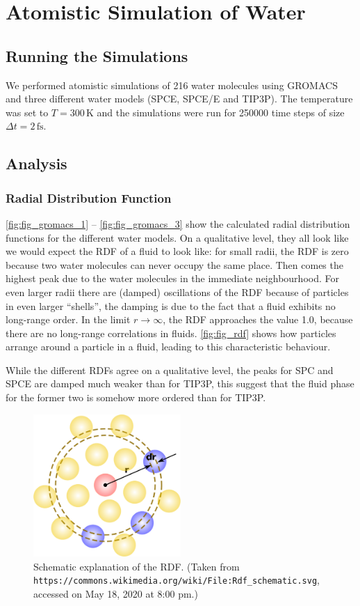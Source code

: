\documentclass[a4paper,10pt,bibtotoc]{scrartcl}
\begin{document}
\newpage
\section{Atomistic Simulation of Water}
\subsection{Running the Simulations}
We performed atomistic simulations of 216 water molecules using GROMACS and three different water models (SPCE, SPCE/E and TIP3P). The temperature was set to $T=300\,\mathrm{K}$ and the simulations were run for 250000 time steps of size $\Delta t = 2\,\mathrm{fs}$.

\subsection{Analysis}
\subsubsection*{Radial Distribution Function}
\autoref{fig:fig_gromacs_1} -- \autoref{fig:fig_gromacs_3} show the calculated radial distribution functions for the different water models.
On a qualitative level, they all look like we would expect the RDF of a fluid to look like: for small radii, the RDF is zero because two water molecules can never occupy the same place. 
Then comes the highest peak due to the water molecules in the immediate neighbourhood. 
For even larger radii there are (damped) oscillations of the RDF because of particles in even larger ``shells'', the damping is due to the fact that a fluid exhibits no long-range order. 
In the limit $r\rightarrow \infty$, the RDF approaches the value 1.0, because there are no long-range correlations in fluids.
\autoref{fig:fig_rdf} shows how particles arrange around a particle in a fluid, leading to this characteristic behaviour.

While the different RDFs agree on a qualitative level, the peaks for SPC and SPCE are damped much weaker than for TIP3P, this suggest that the fluid phase for the former two is somehow more ordered than for TIP3P.

\begin{figure}[h]
\centering
\includegraphics[width=0.5\textwidth]{1024px-Rdf_schematic.png}
\caption{Schematic explanation of the RDF. (Taken from \texttt{https://commons.wikimedia.org/wiki/File:Rdf\_schematic.svg}, accessed on May 18, 2020 at 8:00 pm.)}
\label{fig:fig_rdf}
\end{figure}
\end{document}
